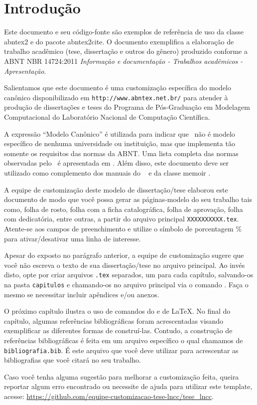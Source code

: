 \chapter[Introdução]{Introdução}\label{cap_intro}

Este documento e seu código-fonte são exemplos de referência de uso da classe
\textsf{abntex2} e do pacote \textsf{abntex2cite}. O documento
exemplifica a elaboração de trabalho acadêmico (tese, dissertação e outros do
gênero) produzido conforme a ABNT NBR 14724:2011 \emph{Informação e documentação
- Trabalhos acadêmicos - Apresentação}.

Salientamos que este documento é uma customização específica do modelo canônico
disponibilizado em \verb"http://www.abntex.net.br/" para atender à produção de
dissertações e teses do Programa de Pós-Graduação em Modelagem Computacional do
Laboratório Nacional de Computação Científica.

A expressão ``Modelo Canônico'' é utilizada para indicar que \abnTeX\ não é
modelo específico de nenhuma universidade ou instituição, mas que implementa tão
somente os requisitos das normas da ABNT. Uma lista completa das normas
observadas pelo \abnTeX\ é apresentada em . Além disso,
este documento deve ser utilizado como complemento dos manuais do \abnTeX\
\cite{abntex2classe,abntex2cite,abntex2cite-alf} e da classe \textsf{memoir}
\cite{memoir}.

A equipe de customização deste modelo de dissertação/tese elaborou este documento
de modo que você possa gerar as páginas-modelo do seu trabalho tais como, folha de
rosto, folha com a ficha catalográfica, folha de aprovação, folha com dedicatória,
entre outras, a partir do arquivo principal \verb"XXXXXXXXXX.tex". Atente-se aos
campos de preenchimento e utilize o símbolo de porcentagem $\%$ para ativar/desativar
uma linha de interesse.

Apesar do exposto no parágrafo anterior, a equipe de customização sugere que você não
escreva o texto de sua dissertação/tese no arquivo principal. Ao invés disto, opte por
criar arquivos \verb".tex" separados, um para cada capítulo, salvando-os na pasta
\verb"capitulos" e chamando-os no arquivo principal via o comando
\verb"". Faça o mesmo se necessitar incluir apêndices
e/ou anexos.

O próximo capítulo ilustra o uso de comandos do \abnTeX e de \LaTeX. No final do capítulo,
algumas referências bibliográficas foram acrescentadas visando exemplificar as diferentes
formas de construí-las. Contudo, a construção de referências bibliográficas é feita em um
arquivo específico o qual chamamos de \verb"bibliografia.bib". É este arquivo que você deve
utilizar para acrescentar as bibliografias que você citará no seu trabalho.

Caso você tenha alguma sugestão para melhorar a customização feita, queira reportar algum
erro encontrado ou necessite de ajuda para utilizar este template, acesse:
\url{https://github.com/equipe-customizacao-tese-lncc/tese_lncc}.
